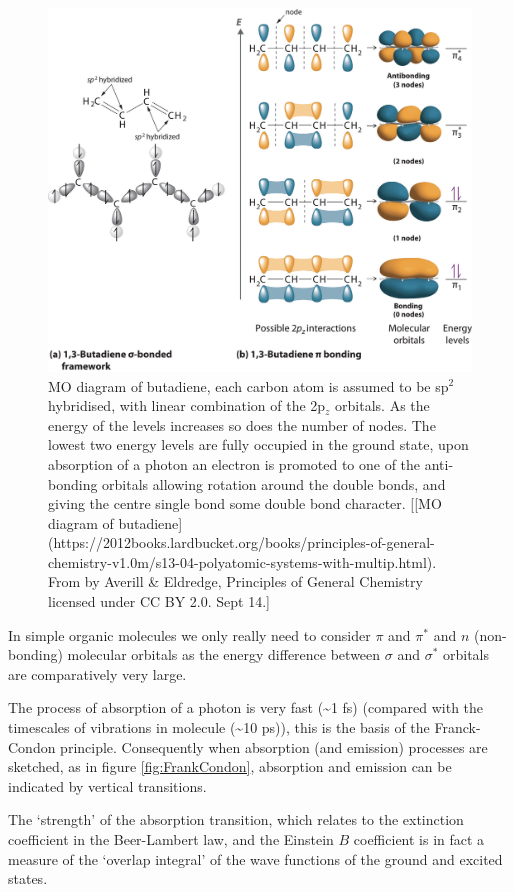 \documentclass[
]{book}
\begin{document}
\begin{figure}

{\centering \includegraphics[width=0.7\linewidth]{images/Butadiene} 

}

\caption{MO diagram of butadiene, each carbon atom is assumed to be sp$^2$ hybridised, with linear combination of the 2p$_z$ orbitals. As the energy of the levels increases so does the number of nodes. The lowest two energy levels are fully occupied in the ground state, upon absorption of a photon an electron is promoted to one of the anti-bonding orbitals allowing rotation around the double bonds, and giving the centre single bond some double bond character. [[MO diagram of butadiene](https://2012books.lardbucket.org/books/principles-of-general-chemistry-v1.0m/s13-04-polyatomic-systems-with-multip.html). From by Averill \& Eldredge, Principles of General Chemistry licensed under CC BY 2.0. Sept 14.]}\label{fig:Butadiene}
\end{figure}

In simple organic molecules we only really need to consider \(\pi\) and \(\pi^\ast\) and \(n\) (non-bonding) molecular orbitals as the energy difference between \(\sigma\) and \(\sigma^\ast\) orbitals are comparatively very large.

The process of absorption of a photon is very fast (\textasciitilde1 fs) (compared with the timescales of vibrations in molecule (\textasciitilde10 ps)), this is the basis of the Franck-Condon principle. Consequently when absorption (and emission) processes are sketched, as in figure \ref{fig:FrankCondon}, absorption and emission can be indicated by vertical transitions.

The `strength' of the absorption transition, which relates to the extinction coefficient in the Beer-Lambert law, and the Einstein \(B\) coefficient is in fact a measure of the `overlap integral' of the wave functions of the ground and excited states.
\end{document}
